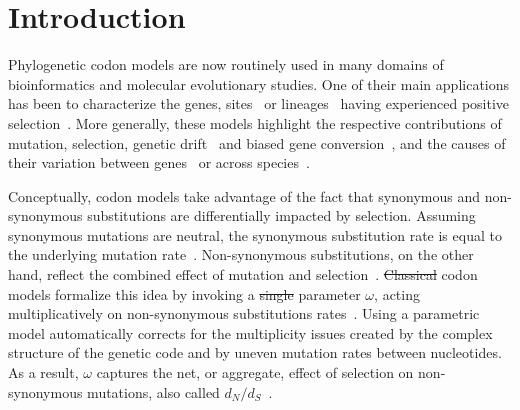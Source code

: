 \documentclass{article}
\newcommand{\dn}{d_N} %
\newcommand{\ds}{d_S} %
\newcommand{\dnds}{\dn / \ds} %
\providecommand{\DIFaddtex}[1]{{\protect\color{blue}\uwave{#1}}} %
\providecommand{\DIFdeltex}[1]{{\protect\color{red}\sout{#1}}}                      %
\providecommand{\DIFaddbegin}{} %
\providecommand{\DIFaddend}{} %
\providecommand{\DIFdelbegin}{} %
\providecommand{\DIFdelend}{} %
\providecommand{\DIFadd}[1]{\texorpdfstring{\DIFaddtex{#1}}{#1}} %
\providecommand{\DIFdel}[1]{\texorpdfstring{\DIFdeltex{#1}}{}} %
\begin{document}

\section{Introduction}

Phylogenetic codon models are now routinely used in many domains of bioinformatics and molecular evolutionary studies.
One of their main applications has been to characterize the genes, sites~\citep{Nielsen1998, Yang2005, Murrell2012} or lineages~\citep{Zhang2004, Pond2011} having experienced positive selection~\citep{Murrell2015, Enard2016}.
More generally, these models highlight the respective contributions of mutation, selection, genetic drift~\citep{Teufel2018} and biased gene conversion~\citep{Pouyet2019, Kosiol2019}, and the causes of their variation between genes~\citep{Zhang2015} or across species~\citep{Seo2004, Popadin2007, Lartillot2011}.

Conceptually, codon models take advantage of the fact that {synonymous} and {non-synonymous} {substitutions} are differentially impacted by selection.
Assuming {synonymous} mutations are {neutral}, the {synonymous} {substitution} rate is equal to the underlying mutation rate~\citep{kimura1983neutral}.
Non-synonymous {substitutions}, on the other hand, reflect the combined effect of mutation and selection~\citep{Ohta1995}.
\DIFdelbegin \DIFdel{Classical }\DIFdelend \DIFaddbegin \DIFadd{Phenomenological }\DIFaddend codon models formalize this idea by invoking a \DIFdelbegin \DIFdel{single }\DIFdelend parameter $\omega$, acting multiplicatively on {non-synonymous} {substitutions} rates~\citep{Muse1994, Goldman1994}.
Using a parametric model automatically corrects for the multiplicity issues created by the complex structure of the genetic code and by uneven mutation rates between nucleotides.
As a result, $\omega$ captures the net, or aggregate, effect of selection on {non-synonymous} mutations, also called $\dnds$~\citep{Spielman2015,DosReis2015}.
\end{document}
